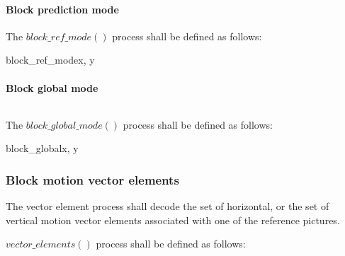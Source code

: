 \paragraph{Block prediction mode}
\label{blockmode}

The $block\_ref\_mode()$ process shall be defined as follows:

\begin{pseudo}{block\_ref\_mode}{x, y}
\bsEND
{}
    \bsEND
\bsEND
{}
\end{pseudo}

\paragraph{Block global mode}
\label{blockglobal}
$\ $\newline

The $block\_global\_mode()$ process shall be defined as follows:

\begin{pseudo}{block\_global}{x, y}
\bsCODE{\BlockData[y][x][\GMode]=\false}
\bsIF{\PictureUsingGlobal==\true}
    \bsIF{\BlockData[y][x][\RMode]!=\Intra}
    \bsEND
\bsEND
\end{pseudo}

\subsubsection{Block motion vector elements}
\label{blockmvelements}

The vector element process shall decode the set of horizontal, or the set of vertical  
motion vector elements associated with one of the reference pictures.

$vector\_elements()$ process shall be defined as follows:

